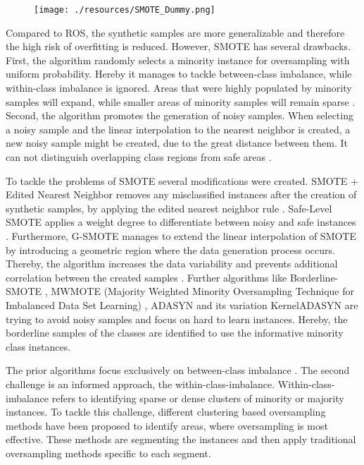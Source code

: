\documentclass[parskip=full]{scrartcl}
\begin{document}
\begin{figure}[H]
	\centering
	\texttt{[image: ./resources/SMOTE\_Dummy.png]}
	\label{fig:Schubach}
\end{figure}

Compared to ROS, the synthetic samples are more generalizable and therefore the
high risk of overfitting is reduced. However, SMOTE has several drawbacks.
First, the algorithm randomly selects a minority instance for oversampling with
uniform probability. Hereby it manages to tackle between-class imbalance, while
within-class imbalance is ignored. Areas that were highly populated by minority
samples will expand, while smaller areas of minority samples will remain sparse
\cite{Prati2004}. Second, the algorithm promotes the generation of noisy
samples. When selecting a noisy sample and the linear interpolation to the
nearest neighbor is created, a new noisy sample might be created, due to the
great distance between them. It can not distinguish overlapping class regions
from safe areas \cite{Bunkhumpornpat2009}. 

To tackle the problems of SMOTE several modifications were created. SMOTE +
Edited Nearest Neighbor removes any misclassified instances after the creation
of synthetic samples, by applying the edited nearest neighbor rule
\cite{Maria2004}. Safe-Level SMOTE applies a weight degree to differentiate
between noisy and safe instances \cite{Bunkhumpornpat2009}. Furthermore, G-SMOTE
manages to extend the linear interpolation of SMOTE by introducing a geometric
region where the data generation process occurs. Thereby, the algorithm
increases the data variability and prevents additional correlation between the
created samples \cite{Douzas2017}. Further algorithms like Borderline-SMOTE
\cite{Han2005}, MWMOTE (Majority Weighted Minority Oversampling Technique for
Imbalanced Data Set Learning) \cite{Barua2014}, ADASYN and its variation
KernelADASYN \cite{Tang2015} are trying to avoid noisy samples and focus on hard
to learn instances. Hereby, the borderline samples of the classes are identified
to use the informative minority class instances.

The prior algorithms focus exclusively on between-class imbalance
\cite{Nekooeimehr2015}. The second challenge is an informed approach, the
within-class-imbalance. Within-class-imbalance refers to identifying sparse or
dense clusters of minority or majority instances. To tackle this challenge,
different clustering based oversampling methods have been proposed to identify
areas, where oversampling is most effective. These methods are segmenting the
instances and then apply traditional oversampling methods specific to each
segment. 
\end{document}

